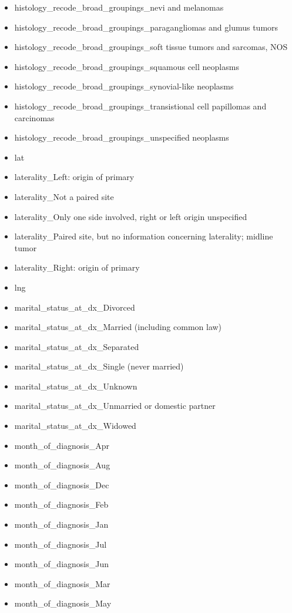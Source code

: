 \documentclass[10pt,letterpaper]{article}
\begin{document}
\begin{itemize}[noitemsep]
\item histology\_recode\_broad\_groupings\_nevi and melanomas
\item histology\_recode\_broad\_groupings\_paragangliomas and glumus tumors
\item histology\_recode\_broad\_groupings\_soft tissue tumors and sarcomas, NOS
\item histology\_recode\_broad\_groupings\_squamous cell neoplasms
\item histology\_recode\_broad\_groupings\_synovial-like neoplasms
\item histology\_recode\_broad\_groupings\_transistional cell papillomas and carcinomas
\item histology\_recode\_broad\_groupings\_unspecified neoplasms
\item lat
\item laterality\_Left: origin of primary
\item laterality\_Not a paired site
\item laterality\_Only one side involved, right or left origin unspecified
\item laterality\_Paired site, but no information concerning laterality; midline tumor
\item laterality\_Right: origin of primary
\item lng
\item marital\_status\_at\_dx\_Divorced
\item marital\_status\_at\_dx\_Married (including common law)
\item marital\_status\_at\_dx\_Separated
\item marital\_status\_at\_dx\_Single (never married)
\item marital\_status\_at\_dx\_Unknown
\item marital\_status\_at\_dx\_Unmarried or domestic partner
\item marital\_status\_at\_dx\_Widowed
\item month\_of\_diagnosis\_Apr
\item month\_of\_diagnosis\_Aug
\item month\_of\_diagnosis\_Dec
\item month\_of\_diagnosis\_Feb
\item month\_of\_diagnosis\_Jan
\item month\_of\_diagnosis\_Jul
\item month\_of\_diagnosis\_Jun
\item month\_of\_diagnosis\_Mar
\item month\_of\_diagnosis\_May

\end{itemize}
\end{document}
